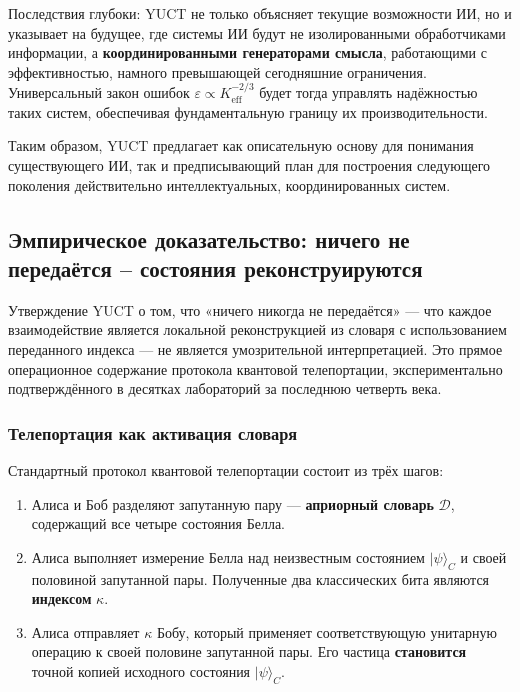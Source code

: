 \documentclass[12pt,a4paper]{article}
\theoremstyle{remark}
\begin{document}
	Последствия глубоки: YUCT не только объясняет текущие возможности ИИ, но и указывает на будущее, где системы ИИ будут не изолированными обработчиками информации, а \textbf{координированными генераторами смысла}, работающими с эффективностью, намного превышающей сегодняшние ограничения. Универсальный закон ошибок $\varepsilon \propto K_{\mathrm{eff}}^{-2/3}$ будет тогда управлять надёжностью таких систем, обеспечивая фундаментальную границу их производительности.
	
	Таким образом, YUCT предлагает как описательную основу для понимания существующего ИИ, так и предписывающий план для построения следующего поколения действительно интеллектуальных, координированных систем.
	
	\subsection{Эмпирическое доказательство: ничего не передаётся – состояния реконструируются}
	
	Утверждение YUCT о том, что «ничего никогда не передаётся» — что каждое взаимодействие является локальной реконструкцией из словаря с использованием переданного индекса — не является умозрительной интерпретацией. Это прямое операционное содержание протокола квантовой телепортации, экспериментально подтверждённого в десятках лабораторий за последнюю четверть века.
	
	\subsubsection{Телепортация как активация словаря}
	
	Стандартный протокол квантовой телепортации \cite{Bennett1993} состоит из трёх шагов:
	\begin{enumerate}
		\item Алиса и Боб разделяют запутанную пару — \textbf{априорный словарь} $\mathcal{D}$, содержащий все четыре состояния Белла.
		\item Алиса выполняет измерение Белла над неизвестным состоянием $|\psi\rangle_C$ и своей половиной запутанной пары. Полученные два классических бита являются \textbf{индексом} $\kappa$.
		\item Алиса отправляет $\kappa$ Бобу, который применяет соответствующую унитарную операцию к своей половине запутанной пары. Его частица \textbf{становится} точной копией исходного состояния $|\psi\rangle_C$.
	\end{enumerate}
	
\end{document}
